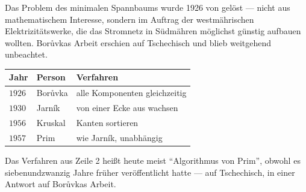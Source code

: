 \begin{geschichte}
Das Problem des minimalen Spannbaums wurde 1926 von  gelöst --- nicht aus mathematischem Interesse, sondern im Auftrag der westmährischen Elektrizitätswerke, die das Stromnetz in Südmähren möglichst günstig aufbauen wollten. Borůvkas Arbeit erschien auf Tschechisch und blieb weitgehend unbeachtet.

\begin{center}
{\small
\renewcommand{\arraystretch}{1.42}
\begin{tabular}{@{}P{2.0cm}P{2.4cm}P{3.8cm}@{}}
\toprule
\textbf{Jahr} & \textbf{Person} & \textbf{Verfahren}\\
\midrule
$1926$ & Borůvka & alle Komponenten gleichzeitig\\
$1930$ & Jarník & von einer Ecke aus wachsen\\
$1956$ & Kruskal & Kanten sortieren\\
$1957$ & Prim & wie Jarník, unabhängig\\
\bottomrule
\end{tabular}}
\end{center}

Das Verfahren aus Zeile 2 heißt heute meist \enquote{Algorithmus von Prim}, obwohl  es siebenundzwanzig Jahre früher veröffentlicht hatte --- auf Tschechisch, in einer Antwort auf Borůvkas Arbeit.

\begin{center}
\begin{minipage}{0.9\textwidth}
\end{minipage}
\end{center}
\end{geschichte}


